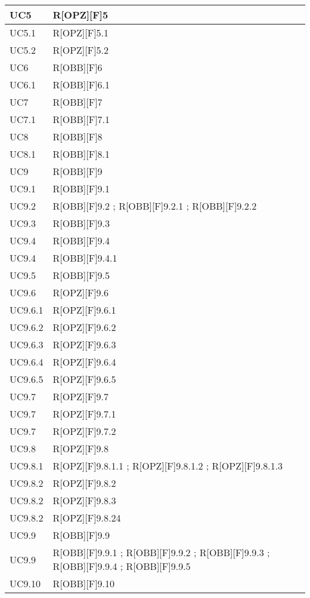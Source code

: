 	\begin{table}[H]
		\centering
		\begin{tabular}{|p{}|p{}|}
			\midrule

			UC5 & R[OPZ][F]5 \\ \midrule
			UC5.1 & R[OPZ][F]5.1 \\ \midrule
			UC5.2 & R[OPZ][F]5.2 \\ \midrule
			UC6 & R[OBB][F]6 \\ \midrule
			UC6.1 & R[OBB][F]6.1 \\ \midrule
			UC7 & R[OBB][F]7 \\ \midrule
			UC7.1 & R[OBB][F]7.1 \\ \midrule
			UC8 & R[OBB][F]8 \\ \midrule
			UC8.1 & R[OBB][F]8.1 \\ \midrule
			UC9 & R[OBB][F]9 \\ \midrule
			UC9.1 & R[OBB][F]9.1 \\ \midrule
			UC9.2 & R[OBB][F]9.2 ; R[OBB][F]9.2.1 ; R[OBB][F]9.2.2 \\ \midrule
			UC9.3 & R[OBB][F]9.3 \\ \midrule
			UC9.4 & R[OBB][F]9.4 \\ \midrule
			UC9.4 & R[OBB][F]9.4.1 \\ \midrule
			UC9.5 & R[OBB][F]9.5 \\ \midrule
			UC9.6 & R[OPZ][F]9.6 \\ \midrule
			UC9.6.1 & R[OPZ][F]9.6.1 \\ \midrule
			UC9.6.2 & R[OPZ][F]9.6.2 \\ \midrule
			UC9.6.3 & R[OPZ][F]9.6.3 \\ \midrule
			UC9.6.4 & R[OPZ][F]9.6.4 \\ \midrule
			UC9.6.5 & R[OPZ][F]9.6.5 \\ \midrule
			UC9.7 & R[OPZ][F]9.7 \\ \midrule
			UC9.7 & R[OPZ][F]9.7.1 \\ \midrule
			UC9.7 & R[OPZ][F]9.7.2 \\ \midrule
			UC9.8 & R[OPZ][F]9.8 \\ \midrule
			UC9.8.1 & R[OPZ][F]9.8.1.1 ; R[OPZ][F]9.8.1.2 ; R[OPZ][F]9.8.1.3 \\ \midrule
			UC9.8.2 & R[OPZ][F]9.8.2 \\ \midrule
			UC9.8.2 & R[OPZ][F]9.8.3 \\ \midrule
			UC9.8.2 & R[OPZ][F]9.8.24 \\ \midrule
			UC9.9 & R[OBB][F]9.9 \\ \midrule
			UC9.9 & R[OBB][F]9.9.1 ; R[OBB][F]9.9.2 ; R[OBB][F]9.9.3 ; R[OBB][F]9.9.4 ; R[OBB][F]9.9.5 \\ \midrule
			UC9.10 & R[OBB][F]9.10 \\ \midrule

		\end{tabular}
	\end{table}
	\newpage
	
